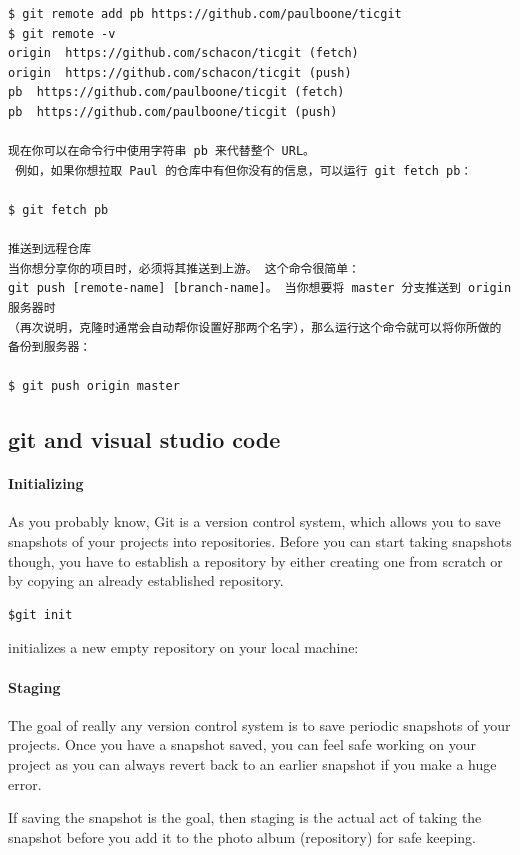 \begin{verbatim}
$ git remote add pb https://github.com/paulboone/ticgit
$ git remote -v
origin	https://github.com/schacon/ticgit (fetch)
origin	https://github.com/schacon/ticgit (push)
pb	https://github.com/paulboone/ticgit (fetch)
pb	https://github.com/paulboone/ticgit (push)

现在你可以在命令行中使用字符串 pb 来代替整个 URL。
 例如，如果你想拉取 Paul 的仓库中有但你没有的信息，可以运行 git fetch pb：

$ git fetch pb

推送到远程仓库
当你想分享你的项目时，必须将其推送到上游。 这个命令很简单：
git push [remote-name] [branch-name]。 当你想要将 master 分支推送到 origin 服务器时
（再次说明，克隆时通常会自动帮你设置好那两个名字），那么运行这个命令就可以将你所做的备份到服务器：

$ git push origin master

\end{verbatim}

\subsection{git and visual studio code}

\paragraph*{Initializing}

As you probably know, Git is a version control system, which allows you to save snapshots of your projects into repositories. Before you can start taking snapshots though, you have to establish a repository by either creating one from scratch or by copying an already established repository.

\begin{verbatim}
$git init 
\end{verbatim}

initializes a new empty repository on your local machine:

\paragraph*{Staging}

The goal of really any version control system is to save periodic snapshots of your projects. Once you have a snapshot saved, you can feel safe working on your project as you can always revert back to an earlier snapshot if you make a huge error.

If saving the snapshot is the goal, then staging is the actual act of taking the snapshot before you add it to the photo album (repository) for safe keeping.

